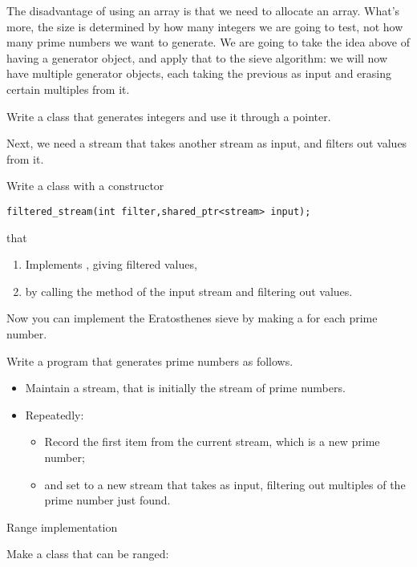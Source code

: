The disadvantage of using an array is that we need to allocate
an array. What's more, the size is determined by how many integers we
are going to test, not how many prime numbers we want to generate.
We are going to take the idea above of having a generator object, and
apply that to the sieve algorithm: we will now have multiple generator
objects, each taking the previous as input and erasing certain
multiples from it.

\begin{exercise}
  Write a  class that generates integers and use it through
  a pointer.
\end{exercise}

Next, we need a stream that takes another stream as input, and filters
out values from it.

\begin{exercise}
  Write a class  with a constructor
\begin{verbatim}
filtered_stream(int filter,shared_ptr<stream> input);
\end{verbatim}
  that
  \begin{enumerate}
  \item Implements , giving filtered values,
  \item by calling the  method of the input stream and
    filtering out values.
  \end{enumerate}
\end{exercise}

Now you can implement the Eratosthenes sieve by making a
 for each prime number.

\begin{exercise}
  Write a program that generates prime numbers as follows.
  \begin{itemize}
  \item Maintain a  stream, that is initially the stream of
    prime numbers.
  \item Repeatedly:
    \begin{itemize}
    \item Record the first item from the current stream, which is a
      new prime number;
    \item and set  to a new stream that takes 
      as input, filtering out multiples of the prime number just found.
    \end{itemize}
  \end{itemize}
\end{exercise}

 {Range implementation}

\prerequisite{\ref{sec:range-iter}}

\begin{exercise}
  \label{ex:primerange}
  Make a  class that can be ranged:
\end{exercise}
